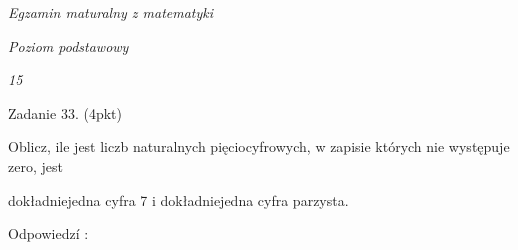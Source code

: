 \documentclass[a4paper,12pt]{article}
\begin{document}
{\it Egzamin maturalny z matematyki}

{\it Poziom podstawowy}

{\it 15}

Zadanie 33. (4pkt)

Oblicz, ile jest liczb naturalnych pięciocyfrowych, w zapisie których nie występuje zero, jest

dokładniejedna cyfra 7 i dokładniejedna cyfra parzysta.

Odpowiedzí :
\end{document}
